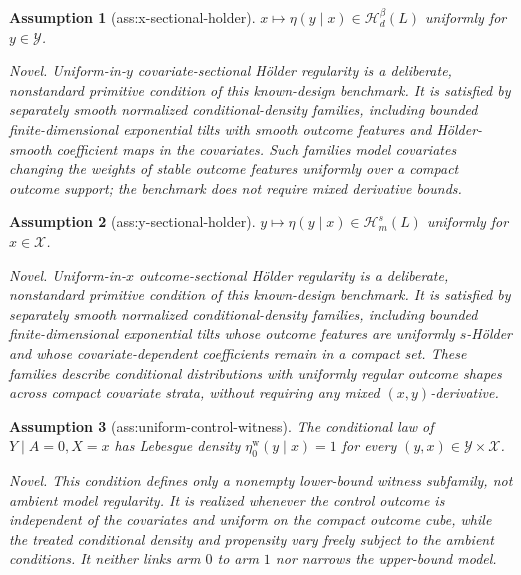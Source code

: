 \documentclass{article}
\newtheorem{assumption}{Assumption}
\begin{document}
\begin{assumption}[ass:x-sectional-holder]\label{ass:x-sectional-holder}
\(x\mapsto\eta(y\mid x)\in\mathcal H_d^{\beta}(L)\) uniformly for \(y\in\mathcal Y\).
\par\smallskip\noindent\emph{Novel.} Uniform-in-\(y\) covariate-sectional Hölder regularity is a deliberate, nonstandard primitive condition of this known-design benchmark. It is satisfied by separately smooth normalized conditional-density families, including bounded finite-dimensional exponential tilts with smooth outcome features and Hölder-smooth coefficient maps in the covariates. Such families model covariates changing the weights of stable outcome features uniformly over a compact outcome support; the benchmark does not require mixed derivative bounds.
\end{assumption}

\begin{assumption}[ass:y-sectional-holder]\label{ass:y-sectional-holder}
\(y\mapsto\eta(y\mid x)\in\mathcal H_m^s(L)\) uniformly for \(x\in\mathcal X\).
\par\smallskip\noindent\emph{Novel.} Uniform-in-\(x\) outcome-sectional Hölder regularity is a deliberate, nonstandard primitive condition of this known-design benchmark. It is satisfied by separately smooth normalized conditional-density families, including bounded finite-dimensional exponential tilts whose outcome features are uniformly \(s\)-Hölder and whose covariate-dependent coefficients remain in a compact set. These families describe conditional distributions with uniformly regular outcome shapes across compact covariate strata, without requiring any mixed \((x,y)\)-derivative.
\end{assumption}

\begin{assumption}[ass:uniform-control-witness]\label{ass:uniform-control-witness}
The conditional law of \(Y\mid A=0,X=x\) has Lebesgue density \(\eta_0^{\mathrm{w}}(y\mid x)=1\) for every \((y,x)\in\mathcal Y\times\mathcal X\).
\par\smallskip\noindent\emph{Novel.} This condition defines only a nonempty lower-bound witness subfamily, not ambient model regularity. It is realized whenever the control outcome is independent of the covariates and uniform on the compact outcome cube, while the treated conditional density and propensity vary freely subject to the ambient conditions. It neither links arm \(0\) to arm \(1\) nor narrows the upper-bound model.
\end{assumption}
\end{document}
